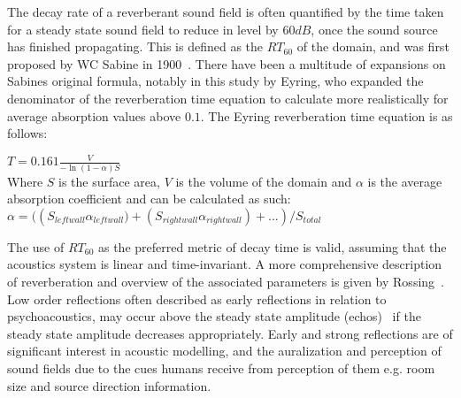 The decay rate of a reverberant sound field is often quantified by the time taken for a steady state sound field to reduce in level by $60{dB}$, once the sound source has finished propagating. This is defined as the $RT_{60}$ of the domain, and was first proposed by WC Sabine in 1900~\cite{Everest2009}. There have been a multitude of expansions on Sabines original formula, notably in this study by Eyring, who expanded the denominator of the reverberation time equation to calculate more realistically for average absorption values above $0.1$. The Eyring reverberation time equation is as follows:\\
\begin{center}
$T = 0.161\frac{V}{-\ln(1 - \alpha)S} $\\
Where $S$ is the surface area, $V$ is the volume of the domain and $\alpha$ is the average absorption coefficient and can be calculated as such:\\
$\alpha = (\left( S_{leftwall} \alpha_{leftwall})+(S_{rightwall} \alpha_{rightwall})+... \right) /S_{total}$ \\
\end{center}
The use of $RT_{60}$ as the preferred metric of decay time is valid, assuming that the acoustics system is linear and time-invariant.
A more comprehensive description of reverberation and overview of the associated parameters is given by Rossing~\cite{rossing2007springer}. \\

Low order reflections often described as early reflections in relation to psychoacoustics, may occur above the steady state amplitude (echos)~\cite{Everest2009} if the steady state amplitude decreases appropriately. Early and strong reflections are of significant interest in acoustic modelling, and the auralization and perception of sound fields due to the cues humans receive from perception of them e.g. room size and source direction information.\\

